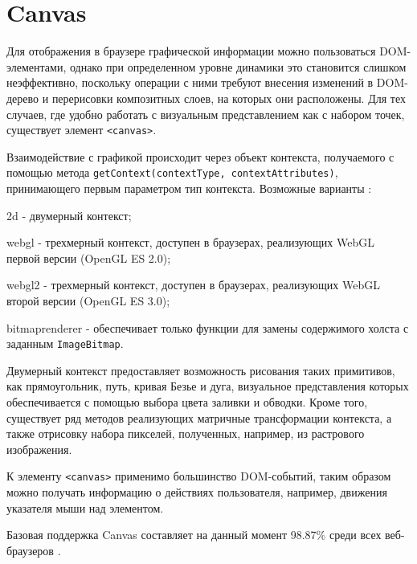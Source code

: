\section{Canvas}

Для отображения в браузере графической информации можно пользоваться DOM-элементами, однако при определенном уровне динамики это становится слишком неэффективно, поскольку операции с ними требуют внесения изменений в DOM-дерево и перерисовки композитных слоев, на которых они расположены. Для тех случаев, где удобно работать с визуальным представлением как с набором точек, существует элемент \lstinline|<canvas>|.


Взаимодействие с графикой происходит через объект контекста, получаемого с помощью метода \lstinline|getContext(contextType, contextAttributes)|, принимающего первым параметром тип контекста. Возможные варианты \cite{get-context}:
\begin{itemize*}
	\item 2d - двумерный контекст;
	\item webgl - трехмерный контекст, доступен в браузерах, реализующих WebGL первой версии (OpenGL ES 2.0);
	\item webgl2 - трехмерный контекст, доступен в браузерах, реализующих WebGL второй версии (OpenGL ES 3.0);
	\item bitmaprenderer - обеспечивает только функции для замены содержимого холста с заданным \lstinline|ImageBitmap|.
\end{itemize*}


Двумерный контекст предоставляет возможность рисования таких примитивов, как прямоугольник, путь, кривая Безье и дуга, визуальное представления которых обеспечивается с помощью выбора цвета заливки и обводки. Кроме того, существует ряд методов реализующих матричные трансформации контекста, а также отрисовку набора пикселей, полученных, например, из растрового изображения.

К элементу \lstinline|<canvas>| применимо большинство DOM-событий, таким образом можно получать информацию о действиях пользователя, например, движения указателя мыши над элементом.

Базовая поддержка Canvas составляет на данный момент 98.87\% среди всех веб-браузеров \cite{caniuse-canvas}.